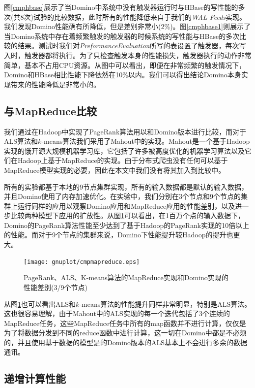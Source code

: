 图\ref{cmphbase}展示了当Domino中系统中没有触发器运行时与HBase的写性能的多次(共8次)试验的比较数据，此时所有的性能降低来自于我们的\textit{WAL Feeds}实现。我们发现Domino性能确有所降低，但是差别非常小(2\%)。图\ref{cmphbase1}则展示了当Domino系统中存在着频繁触发的触发器的时候系统的写性能与HBase的多次比较的结果。测试时我们对\textit{PreformanceEvaluation}所写的表设置了触发器，每次写入时，触发器都将执行。为了只检查触发本身的性能损失，触发器执行的动作非常简单，基本不占用CPU资源。从图中可以看出，即便在非常频繁的触发情况下，Domino和HBase相比性能下降依然在10\%以内。我们可以得出结论Domino本身实现带来的性能降低是非常小的。

\subsection{与MapReduce比较}

我们通过在Hadoop中实现了PageRank算法用以和Domino版本进行比较，而对于ALS算法和$k$-means算法我们采用了Mahout\cite{mahoutproject}中的实现。Mahout是一个基于Hadoop实现的饿开源大规模机器学习库，它包括了许多被高度优化的机器学习算法以及它们在Hadoop上基于MapReduce的实现。由于分布式爬虫没有任何可以基于MapReduce模型实现的必要，因此在本文中我们没有将其加入到比较中。

所有的实验都基于本地的9节点集群实现，所有的输入数据都是默认的输入数据，并且Domino使用了内存加速优化。在实验中，我们分别在3个节点和9个节点的集群上运行同样的应用以观察Domino应用和MapReduce应用的性能差别，以及进一步比较两种模型下应用的扩放性。从图\ref{spd}可以看出，在1百万个点的输入数据下，Domino的PageRank算法性能至少达到了基于Hadoop的PageRank实现的10倍以上的性能。而对于9个节点的集群来说，Domino下性能提升较Hadoop的提升也更大。

\begin{figure}[h!]
  \centering
  \texttt{[image: gnuplot/cmpmapreduce.eps]}
  \caption{PageRank、ALS、K-means算法的MapReduce实现和Domino实现的性能差别(3/9个节点)}
  \label{spd}
\end{figure}


从图\ref{spd}也可以看出ALS和$k$-means算法的性能提升同样非常明显，特别是ALS算法。这也很容易理解，由于Mahout中的ALS实现的每一个迭代包括了3个连续的MapReduce任务，这些MapReduce任务中所有的map函数并不进行计算，仅仅是为了将数据分发到不同的reduce函数中进行计算，这一切在Domino中都是不必须的，并且使用基于数据的模型是的Domino版本的ALS基本上不会进行多余的数据通讯。

\subsection{递增计算性能}

